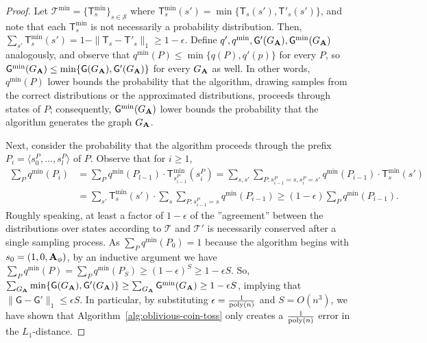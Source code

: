 \begin{proof}
Let $\mathcal{T}^{\min}=\{\mathsf{T}^{\min}_s\}_{s\in\mathcal{S}}$ where $\mathsf{T}^{\min}_s(s') = \min\{\mathsf{T}_s(s'),\mathsf{T}'_s(s')\}$, and note that each $\mathsf{T}^{\min}_s$ is not necessarily a probability distribution. Then, $\sum_{s'} \mathsf{T}^{\min}_s(s') = 1 - \|\mathsf{T}_s-\mathsf{T}'_s\|_1 \geq 1-\epsilon$. Define $q', q^{\min}, \mathsf{G}'(G_{\mathbf{A}}),\mathsf{G}^{\min}(G_{\mathbf{A}})$ analogously, and observe that $q^{\min}(P) \leq \min\{q(P), q'(p)\}$ for every $P$, so $\mathsf{G}^{\min}(G_{\mathbf{A}}) \leq \min\{\mathsf{G}(G_{\mathbf{A}}),\mathsf{G}'(G_{\mathbf{A}})\}$ for every $G_{\mathbf{A}}$ as well. In other words, $q^{\min}(P)$ lower bounds the probability that the algorithm, drawing samples from the correct distributions or the approximated distributions, proceeds through states of $P$; consequently, $\mathsf{G}^{\min}(G_{\mathbf{A}})$ lower bounds the probability that the algorithm generates the graph $G_{\mathbf{A}}$.

Next, consider the probability that the algorithm proceeds through the prefix $P_i = \langle s^P_0, \ldots, s^P_{l}\rangle$ of $P$. Observe that for $i \geq 1$,
\begin{align*}\sum_{P} q^{\min}(P_i) &=\sum_{P} q^{\min}(P_{l-1})\cdot \mathsf{T}^{\min}_{s^P_{i-1}}(s^P_{i}) 
= \sum_{s,s'} \sum_{P:s^P_{i-1} = s,s^P_{i} = s'} q^{\min}(P_{i-1})\cdot \mathsf{T}^{\min}_{s}(s') \\
&= \sum_{s'} \mathsf{T}^{\min}_s(s')\cdot\sum_{s} \sum_{P:s^P_{i-1} = s} q^{\min}(P_{i-1})
\geq (1-\epsilon) \sum_{P} q^{\min}(P_{i-1}).\end{align*}
Roughly speaking, at least a factor of $1-\epsilon$ of the ''agreement'' between the distributions over states according to $\mathcal{T}$ and $\mathcal{T}'$ is necessarily conserved after a single sampling process. As $\sum_{P} q^{\min}(P_0)=1$ because the algorithm begins with $s_0 = (1, 0, \mathbf{A}_\phi)$, by an inductive argument we have $\sum_{P} q^{\min}(P)=\sum_{P} q^{\min}(P_S) \geq (1-\epsilon)^S \geq 1-\epsilon S$. So, $\sum_{G_{\mathbf{A}}} \min\{\mathsf{G}(G_{\mathbf{A}}),\mathsf{G}'(G_{\mathbf{A}})\} \geq \sum_{G_{\mathbf{A}}} \mathsf{G}^{\min}(G_{\mathbf{A}}) \geq 1-\epsilon S$, implying that $\|\mathsf{G}-\mathsf{G}'\|_1 \leq \epsilon S$. In particular,  by substituting $\epsilon = \frac{1}{\mathrm{poly}(n)}$ and $S = O(n^3)$, we have shown that Algorithm~\ref{alg:oblivious-coin-toss} only creates a $\frac{1}{\mathrm{poly}(n)}$ error in the $L_1$-distance. 
\end{proof}


